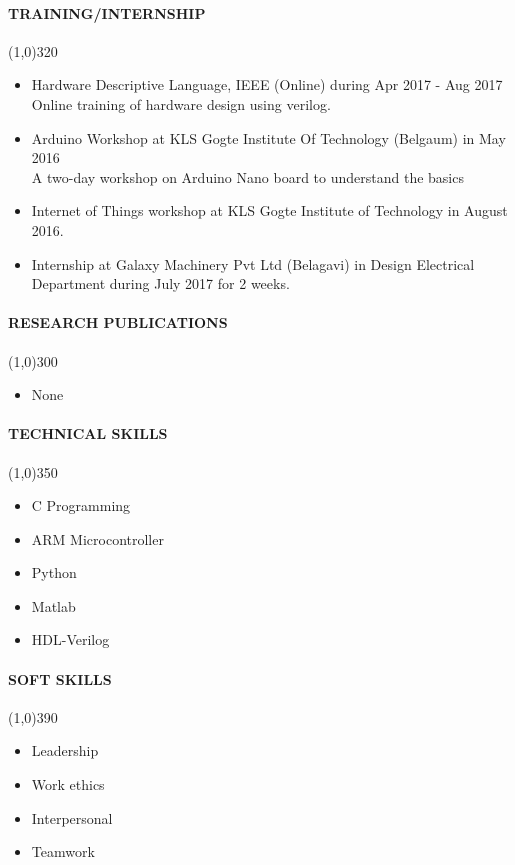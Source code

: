 \documentclass[12pt,a4paper]{article}
\begin{document}
\paragraph{TRAINING/INTERNSHIP}
	\line(1,0){320}
	\begin{itemize}
		\item Hardware Descriptive Language,  IEEE (Online) during Apr 2017 - Aug 2017\\
Online training of hardware design using verilog.
	\item Arduino Workshop at KLS Gogte Institute Of Technology (Belgaum) in May 2016\\
A two-day workshop on Arduino Nano board to understand the basics
	\item Internet of Things workshop at KLS Gogte Institute of Technology in August 2016.
	\item Internship at Galaxy Machinery Pvt Ltd (Belagavi) in Design Electrical Department during July 2017 for 2 weeks.
	\end{itemize}
\paragraph{RESEARCH PUBLICATIONS}
	\line(1,0){300}
	\begin{itemize}
		\item None
	\end{itemize}

\paragraph{TECHNICAL SKILLS}
	\line(1,0){350}
	\begin{itemize}
		\item C Programming
		\item ARM Microcontroller
		\item Python
		\item Matlab
		\item HDL-Verilog
	\end{itemize}
\paragraph{SOFT SKILLS}
	\line(1,0){390}
	\begin{itemize}
		\item Leadership
		\item Work ethics
		\item Interpersonal
		\item Teamwork
	\end{itemize}
\end{document}
